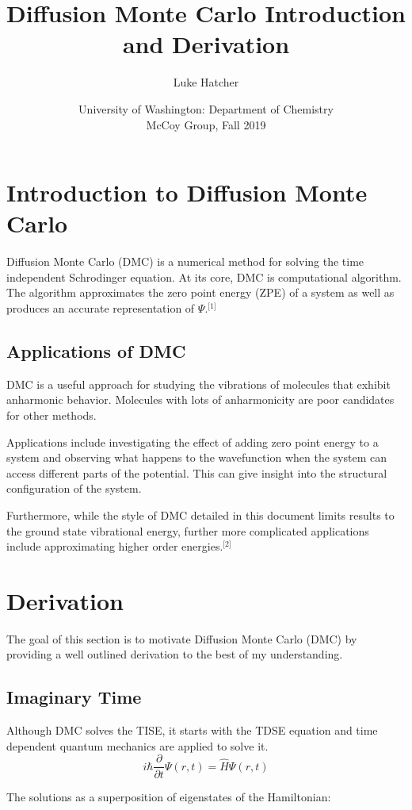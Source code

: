 \documentclass{article}
\title{Diffusion Monte Carlo Introduction and Derivation}
\author{Luke Hatcher}
\date{University of Washington: Department of Chemistry \\ McCoy Group, Fall 2019}
\begin{document}
\maketitle

\section{Introduction to Diffusion Monte Carlo}
Diffusion Monte Carlo (DMC) is a numerical method for solving the time independent Schrodinger equation. At its core, DMC is computational algorithm. The algorithm approximates the zero point energy (ZPE) of a system as well as produces an accurate representation of $\Psi$.$^\text{[1]}$
\subsection{Applications of DMC}
DMC is a useful approach for studying the vibrations of molecules that exhibit anharmonic behavior. Molecules with lots of anharmonicity are poor candidates for other methods.  

Applications include investigating the effect of adding zero point energy to a system and observing what happens to the wavefunction when the system can access different parts of the potential. This can give insight into the structural configuration of the system. 

Furthermore, while the style of DMC detailed in this document limits results to the ground state vibrational energy, further more complicated applications include approximating higher order energies.$^\text{[2]}$

\section{Derivation}
The goal of this section is to motivate Diffusion Monte Carlo (DMC) by providing a well outlined derivation to the best of my understanding.
\subsection{Imaginary Time}
Although DMC solves the TISE, it starts with the TDSE equation and time dependent quantum mechanics are applied to solve it.
\begin{equation} \label{eqn}
{i\hbar\frac{\partial}{\partial t}}\Psi(r,t)=\hat{H}{\Psi(r,t)}
\end{equation}

The solutions as a superposition of eigenstates of the Hamiltonian:
\end{document}

